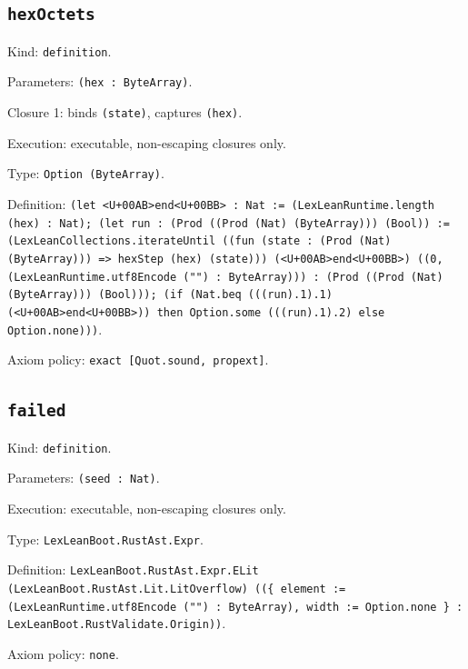\documentclass[11pt]{article}
\begin{document}
\subsection*{\texttt{hexOctets}}
\noindent Kind: \texttt{definition}.\par
\noindent Parameters: \texttt{(hex : ByteArray)}.\par
\noindent Closure 1: binds \texttt{(state)}, captures \texttt{(hex)}.\par
\noindent Execution: executable, non-escaping closures only.\par
\noindent Type: \texttt{Option (ByteArray)}.\par
\noindent Definition: \texttt{(let <U+00AB>end<U+00BB> : Nat := (LexLeanRuntime.length (hex) : Nat); (let run : (Prod ((Prod (Nat) (ByteArray))) (Bool)) := (LexLeanCollections.iterateUntil ((fun (state : (Prod (Nat) (ByteArray))) => hexStep (hex) (state))) (<U+00AB>end<U+00BB>) ((0, (LexLeanRuntime.utf8Encode ("") : ByteArray))) : (Prod ((Prod (Nat) (ByteArray))) (Bool))); (if (Nat.beq (((run).1).1) (<U+00AB>end<U+00BB>)) then Option.some (((run).1).2) else Option.none)))}.\par
\noindent Axiom policy: \texttt{exact [Quot.sound, propext]}.\par
\subsection*{\texttt{failed}}
\noindent Kind: \texttt{definition}.\par
\noindent Parameters: \texttt{(seed : Nat)}.\par
\noindent Execution: executable, non-escaping closures only.\par
\noindent Type: \texttt{LexLeanBoot.RustAst.Expr}.\par
\noindent Definition: \texttt{LexLeanBoot.RustAst.Expr.ELit (LexLeanBoot.RustAst.Lit.LitOverflow) ((\{ element := (LexLeanRuntime.utf8Encode ("") : ByteArray), width := Option.none \} : LexLeanBoot.RustValidate.Origin))}.\par
\noindent Axiom policy: \texttt{none}.\par
\end{document}
